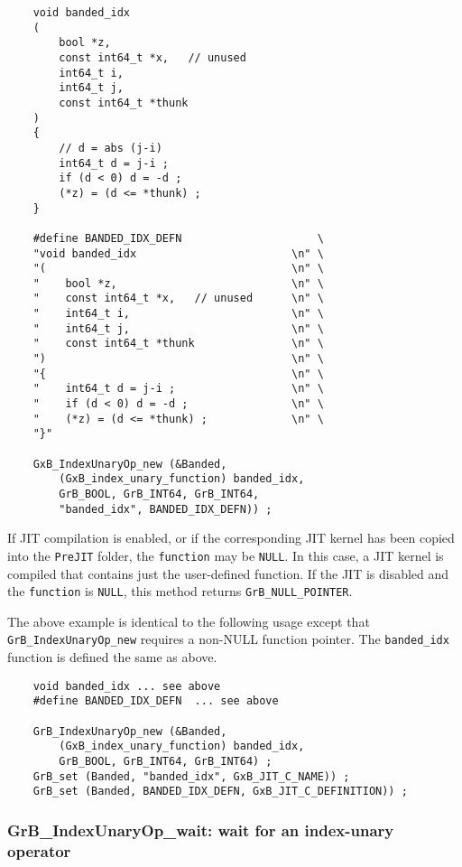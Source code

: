 \documentclass[12pt]{article}
\begin{document}
{\footnotesize
\begin{verbatim}
    void banded_idx
    (
        bool *z,
        const int64_t *x,   // unused
        int64_t i,
        int64_t j,
        const int64_t *thunk
    )
    {
        // d = abs (j-i)
        int64_t d = j-i ;
        if (d < 0) d = -d ;
        (*z) = (d <= *thunk) ;
    }

    #define BANDED_IDX_DEFN                     \
    "void banded_idx                        \n" \
    "(                                      \n" \
    "    bool *z,                           \n" \
    "    const int64_t *x,   // unused      \n" \
    "    int64_t i,                         \n" \
    "    int64_t j,                         \n" \
    "    const int64_t *thunk               \n" \
    ")                                      \n" \
    "{                                      \n" \
    "    int64_t d = j-i ;                  \n" \
    "    if (d < 0) d = -d ;                \n" \
    "    (*z) = (d <= *thunk) ;             \n" \
    "}"

    GxB_IndexUnaryOp_new (&Banded,
        (GxB_index_unary_function) banded_idx,
        GrB_BOOL, GrB_INT64, GrB_INT64,
        "banded_idx", BANDED_IDX_DEFN)) ;\end{verbatim}}

If JIT compilation is enabled, or if the corresponding JIT kernel has been
copied into the \verb'PreJIT' folder, the \verb'function' may be \verb'NULL'.
In this case, a JIT kernel is compiled that contains just the user-defined
function.  If the JIT is disabled and the \verb'function' is \verb'NULL', this
method returns \verb'GrB_NULL_POINTER'.

The above example is identical to the following usage
except that \verb'GrB_IndexUnaryOp_new' requires a non-NULL function pointer.
The \verb'banded_idx' function is defined the same as above.

{\footnotesize
\begin{verbatim}
    void banded_idx ... see above
    #define BANDED_IDX_DEFN  ... see above

    GrB_IndexUnaryOp_new (&Banded,
        (GxB_index_unary_function) banded_idx,
        GrB_BOOL, GrB_INT64, GrB_INT64) ;
    GrB_set (Banded, "banded_idx", GxB_JIT_C_NAME)) ;
    GrB_set (Banded, BANDED_IDX_DEFN, GxB_JIT_C_DEFINITION)) ;\end{verbatim}}

\subsubsection{{\sf GrB\_IndexUnaryOp\_wait:} wait for an index-unary operator}
\label{idxunop_wait}
\end{document}
